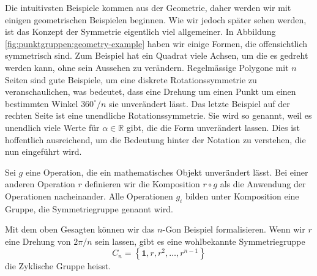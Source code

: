 Die intuitivsten Beispiele kommen aus der Geometrie, daher werden wir mit
einigen geometrischen Beispielen beginnen. Wie wir jedoch später sehen werden,
ist das Konzept der Symmetrie eigentlich viel allgemeiner.  In Abbildung
\ref{fig:punktgruppen:geometry-example} haben wir einige Formen, die
offensichtlich symmetrisch sind.  Zum Beispiel hat ein Quadrat viele Achsen, um
die es gedreht werden kann, ohne sein Aussehen zu verändern.  Regelmässige
Polygone mit \(n\) Seiten sind gute Beispiele, um eine diskrete
Rotationssymmetrie zu veranschaulichen, was bedeutet, dass eine Drehung um
einen Punkt um einen bestimmten Winkel \(360^\circ/n\) sie unverändert lässt.
Das letzte Beispiel auf der rechten Seite ist eine unendliche
Rotationssymmetrie. Sie wird so genannt, weil es unendlich viele Werte für
\(\alpha \in \mathbb{R}\) gibt, die die Form unverändert lassen.  Dies ist
hoffentlich ausreichend, um die Bedeutung hinter der Notation zu verstehen, die
nun eingeführt wird.

\begin{definition}[Symmetriegruppe]
	Sei \(g\) eine Operation, die ein mathematisches Objekt unverändert lässt.
	Bei einer anderen Operation \(r\) definieren wir die Komposition \(r\circ g\)
	als die Anwendung der Operationen nacheinander. Alle Operationen \(g_i\)
	bilden unter Komposition eine Gruppe, die Symmetriegruppe genannt wird.
\end{definition}

Mit dem oben Gesagten können wir das \(n\)-Gon Beispiel formalisieren. Wenn wir
\(r\) eine Drehung von \(2\pi/n\) sein lassen, gibt es eine wohlbekannte Symmetriegruppe
\[
	C_n = \left\{\mathbf{1}, r, r^2, \ldots, r^{n-1}\right\}
\]
die Zyklische Gruppe heisst.

\begin{definition}[Gruppenwirkung]
\end{definition}

